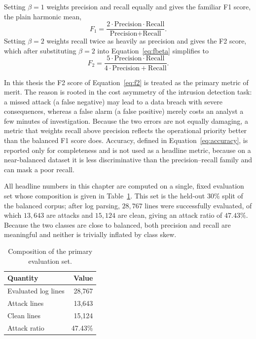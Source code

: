 \documentclass[../main.tex]{subfiles}
\begin{document}
Setting $\beta = 1$ weights precision and recall equally and gives the
familiar F1 score, the plain harmonic mean,
\begin{equation}
  F_1 = \frac{2 \cdot \text{Precision} \cdot \text{Recall}}
             {\text{Precision} + \text{Recall}}.
  \label{eq:f1}
\end{equation}
Setting $\beta = 2$ weights recall twice as heavily as precision and gives the
F2 score, which after substituting $\beta = 2$ into
Equation~\ref{eq:fbeta} simplifies to
\begin{equation}
  F_2 = \frac{5 \cdot \text{Precision} \cdot \text{Recall}}
             {4 \cdot \text{Precision} + \text{Recall}}.
  \label{eq:f2}
\end{equation}

In this thesis the F2 score of Equation~\ref{eq:f2} is treated as the primary
metric of merit. The reason is rooted in the cost asymmetry of the intrusion
detection task: a missed attack (a false negative) may lead to a data breach
with severe consequences, whereas a false alarm (a false positive) merely
costs an analyst a few minutes of investigation. Because the two errors are
not equally damaging, a metric that weights recall above precision reflects
the operational priority better than the balanced F1 score does. Accuracy,
defined in Equation~\ref{eq:accuracy}, is reported only for completeness and
is not used as a headline metric, because on a near-balanced dataset it is
less discriminative than the precision--recall family and can mask a poor
recall.

All headline numbers in this chapter are computed on a single, fixed
evaluation set whose composition is given in Table~\ref{tab:evalset}. This
set is the held-out $30\%$ split of the balanced corpus; after log parsing,
$28{,}767$ lines were successfully evaluated, of which $13{,}643$ are
attacks and $15{,}124$ are clean, giving an attack ratio of $47.43\%$.
Because the two classes are close to balanced, both precision and recall are
meaningful and neither is trivially inflated by class skew.

\begin{table}[H]
  \centering
  \caption{Composition of the primary evaluation set.}
  \label{tab:evalset}
  \renewcommand{\arraystretch}{1.35}
  \setlength{\tabcolsep}{10pt}
  \footnotesize
  \begin{tabular}{|l|r|}
    \hline
    \textbf{Quantity} & \textbf{Value} \\
    \hline
    Evaluated log lines & 28{,}767 \\
    \hline
    Attack lines & 13{,}643 \\
    \hline
    Clean lines & 15{,}124 \\
    \hline
    Attack ratio & 47.43\% \\
    \hline
  \end{tabular}
\end{table}
\end{document}
